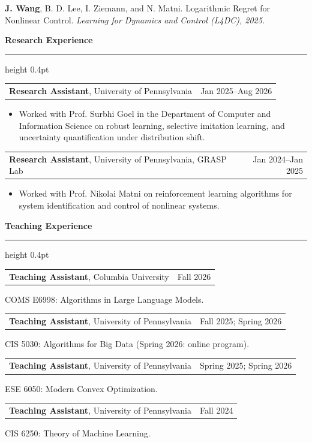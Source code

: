 \documentclass[10pt,letterpaper]{article}
\makeatletter
\newcommand{\cvsection}[1]{%
  \par\addpenalty{-300}\addvspace{12pt}%
  {\large\bfseries #1\par}%
  \nobreak\vspace{3pt}\hrule height 0.4pt%
  \nobreak\vspace{6pt}\nobreak
}
\newcommand{\entrysep}{\par\addvspace{6pt}}
\newcommand{\entry}[2]{\noindent\begin{tabularx}{\textwidth}{@{}Xr@{}}#1 & #2\end{tabularx}\par\nobreak\vspace{2pt}}
\makeatother
\begin{document}
\begin{samepage}
\textbf{J. Wang}, B. D. Lee, I. Ziemann, and N. Matni. Logarithmic Regret for Nonlinear Control. \textit{Learning for Dynamics and Control (L4DC), 2025.}\par
\end{samepage}\entrysep
\cvsection{Research Experience}
\begin{samepage}
\entry{\textbf{Research Assistant}, University of Pennsylvania}{Jan 2025--Aug 2026}
\begin{itemize}
\item Worked with Prof. Surbhi Goel in the Department of Computer and Information Science on robust learning, selective imitation learning, and uncertainty quantification under distribution shift.
\end{itemize}
\end{samepage}\entrysep
\begin{samepage}
\entry{\textbf{Research Assistant}, University of Pennsylvania, GRASP Lab}{Jan 2024--Jan 2025}
\begin{itemize}
\item Worked with Prof. Nikolai Matni on reinforcement learning algorithms for system identification and control of nonlinear systems.
\end{itemize}
\end{samepage}\entrysep
\cvsection{Teaching Experience}
\begin{samepage}
\entry{\textbf{Teaching Assistant}, Columbia University}{Fall 2026}
COMS E6998: Algorithms in Large Language Models.\par
\end{samepage}\entrysep
\begin{samepage}
\entry{\textbf{Teaching Assistant}, University of Pennsylvania}{Fall 2025; Spring 2026}
CIS 5030: Algorithms for Big Data (Spring 2026: online program).\par
\end{samepage}\entrysep
\begin{samepage}
\entry{\textbf{Teaching Assistant}, University of Pennsylvania}{Spring 2025; Spring 2026}
ESE 6050: Modern Convex Optimization.\par
\end{samepage}\entrysep
\begin{samepage}
\entry{\textbf{Teaching Assistant}, University of Pennsylvania}{Fall 2024}
CIS 6250: Theory of Machine Learning.\par
\end{samepage}\entrysep
\end{document}

